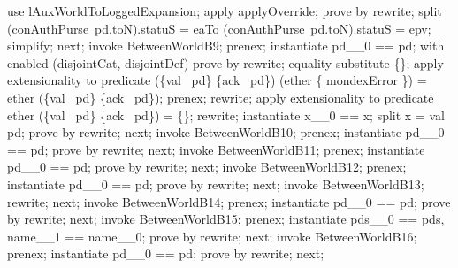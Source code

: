 \begin{LPScript}
\begin{zproof}[lBetweenWorldCAbortType]
        use lAuxWorldToLoggedExpansion;
        apply applyOverride;
        prove by rewrite;
        split (conAuthPurse~pd.toN).statuS = eaTo
            \lor (conAuthPurse~pd.toN).statuS = epv;
        simplify;
    next;
        invoke BetweenWorldB9;
        prenex;
        instantiate pd\_\_0 == pd;
        with enabled (disjointCat, disjointDef) prove by rewrite;
        equality substitute \{\};
        apply extensionality to predicate
            (\{val~ pd\} \cup \{ack~ pd\}) \cap (ether \cup \{ mondexError \})
            = ether \cap (\{val~ pd\} \cup \{ack~ pd\});
        prenex;
        rewrite;
        apply extensionality to predicate
            ether \cap (\{val~ pd\} \cup \{ack~ pd\}) = \{\};
        rewrite;
        instantiate x\_\_0 == x;
        split x = val~ pd;
        prove by rewrite;
    next;
        invoke BetweenWorldB10;
        prenex;
        instantiate pd\_\_0 == pd;
        prove by rewrite;
    next;
        invoke BetweenWorldB11;
        prenex;
        instantiate pd\_\_0 == pd;
        prove by rewrite;
    next;
        invoke BetweenWorldB12;
        prenex;
        instantiate pd\_\_0 == pd;
        prove by rewrite;
    next;
        invoke BetweenWorldB13;
        rewrite;
    next;
        invoke BetweenWorldB14;
        prenex;
        instantiate pd\_\_0 == pd;
        prove by rewrite;
    next;
        invoke BetweenWorldB15;
        prenex;
        instantiate pds\_\_0 == pds, name\_\_1 == name\_\_0;
        prove by rewrite;
    next;
        invoke BetweenWorldB16;
        prenex;
        instantiate pd\_\_0 == pd;
        prove by rewrite;
    next;
\end{zproof}\end{LPScript}

